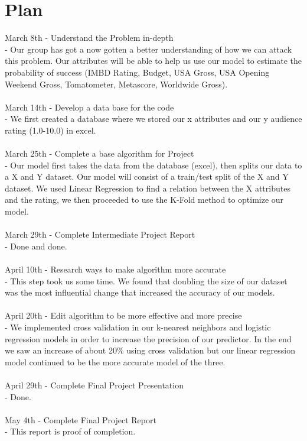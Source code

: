 \documentclass[10pt,twocolumn,letterpaper]{article}
\begin{document}
\section{Plan}
	March 8th - Understand the Problem in-depth\\
	- Our group has got a now gotten a better understanding of how we can attack this problem. Our attributes will be able to help us use our model to estimate the probability of success (IMBD Rating, Budget, USA Gross, USA Opening Weekend Gross, Tomatometer, Metascore, Worldwide Gross).\\\\
	March 14th - Develop a data base for the code\\
	- We first created a database where we stored our x attributes and our y audience rating (1.0-10.0) in excel.\\\\
	March 25th - Complete a base algorithm for Project\\
	- Our model first takes the data from the database (excel), then splits our data to a X and Y dataset. Our model will consist of a train/test split of the X and Y dataset. We used Linear Regression to find a relation between the X attributes and the rating, we then proceeded to use the K-Fold method to optimize our model.\\\\
	March 29th - Complete Intermediate Project Report\\
	- Done and done.\\\\
	April 10th - Research ways to make algorithm more accurate\\
	- This step took us some time. We found that doubling the size of our dataset was the most influential change that increased the accuracy of our models.\\\\
	April 20th - Edit algorithm to be more effective and more precise\\
	- We implemented cross validation in our k-nearest neighbors and logistic regression models in order to increase the precision of our predictor. In the end we saw an increase of about 20\% using cross validation but our linear regression model continued to be the more accurate model of the three.\\\\
	April 29th - Complete Final Project Presentation\\
	- Done.\\\\
	May 4th - Complete Final Project Report\\
	- This report is proof of completion.
\end{document}
